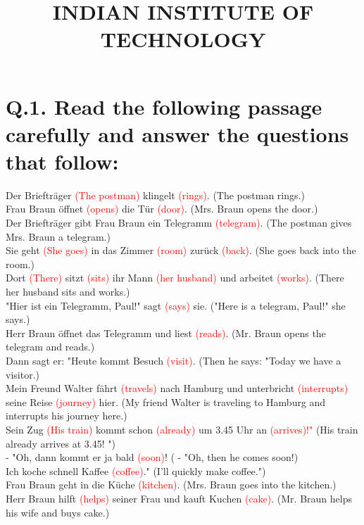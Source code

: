 \documentclass{article}
\title{
INDIAN INSTITUTE OF TECHNOLOGY
}
\date{}
\begin{document}
\maketitle

\section*{Q.1. Read the following passage carefully and answer the questions that follow:}

Der Briefträger \textcolor{red}{(The postman)} klingelt \textcolor{red}{(rings)}. (The postman rings.) \\
Frau Braun öffnet \textcolor{red}{(opens)} die Tür \textcolor{red}{(door)}. (Mrs. Braun opens the door.) \\
Der Briefträger gibt Frau Braun ein Telegramm \textcolor{red}{(telegram)}. (The postman gives Mrs. Braun a telegram.) \\
Sie geht \textcolor{red}{(She goes)} in das Zimmer \textcolor{red}{(room)} zurück \textcolor{red}{(back)}. (She goes back into the room.) \\
Dort \textcolor{red}{(There)} sitzt \textcolor{red}{(sits)} ihr Mann \textcolor{red}{(her husband)} und arbeitet \textcolor{red}{(works)}. (There her husband sits and works.) \\
"Hier ist ein Telegramm, Paul!" sagt \textcolor{red}{(says)} sie. ("Here is a telegram, Paul!" she says.) \\
Herr Braun öffnet das Telegramm und liest \textcolor{red}{(reads)}. (Mr. Braun opens the telegram and reads.) \\
Dann sagt er: "Heute kommt Besuch \textcolor{red}{(visit)}. (Then he says: "Today we have a visitor.) \\
Mein Freund Walter fährt \textcolor{red}{(travels)} nach Hamburg und unterbricht \textcolor{red}{(interrupts)} seine Reise \textcolor{red}{(journey)} hier. (My friend Walter is traveling to Hamburg and interrupts his journey here.) \\
Sein Zug \textcolor{red}{(His train)} kommt schon \textcolor{red}{(already)} um 3.45 Uhr an \textcolor{red}{(arrives)!"} (His train already arrives at 3.45! ") \\
- "Oh, dann kommt er ja bald \textcolor{red}{(soon)}! ( - "Oh, then he comes soon!) \\
Ich koche schnell Kaffee \textcolor{red}{(coffee)}." (I'll quickly make coffee.") \\
Frau Braun geht in die Küche \textcolor{red}{(kitchen)}. (Mrs. Braun goes into the kitchen.) \\
Herr Braun hilft \textcolor{red}{(helps)} seiner Frau und kauft Kuchen \textcolor{red}{(cake)}. (Mr. Braun helps his wife and buys cake.)
\end{document}

